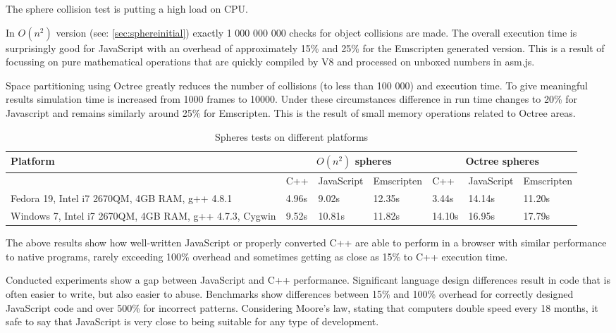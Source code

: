 The sphere collision test is putting a high load on CPU.

In $O(n^2)$ version (see: \ref{sec:sphereinitial}) exactly 1 000 000 000 checks for object collisions are made. The overall execution time is surprisingly good for JavaScript with an overhead of approximately 15\% and 25\% for the Emscripten generated version. This is a result of focussing on pure mathematical operations that are quickly compiled by V8 and processed on unboxed numbers in asm.js.

Space partitioning using Octree greatly reduces the number of collisions (to less than 100 000) and execution time. To give meaningful results simulation time is increased from 1000 frames to 10000. Under these circumstances difference in run time changes to 20\% for Javascript and remains similarly around 25\% for Emscripten. This is the result of small memory operations related to Octree areas.

\begin{table}[h!]
\caption{Spheres tests on different platforms}
\label{table:benchmarks}
\begin{tabular}{|p{4cm}||l|l|l||l|l|l|}
   \hline
   Platform & \multicolumn{3}{c}{$O(n^2)$ spheres} & \multicolumn{3}{c}{Octree spheres}\\ \hline
   & C++ & JavaScript & Emscripten & C++ & JavaScript & Emscripten\\ \hline
   Fedora 19, Intel i7 2670QM, 4GB RAM, g++ 4.8.1 & 4.96s & 9.02s & 12.35s & 
3.44s & 14.14s & 11.20s \\ \hline
   Windows 7, Intel i7 2670QM, 4GB RAM, g++ 4.7.3, Cygwin & 9.52s & 10.81s & 11.82s & 14.10s & 16.95s & 17.79s \\\hline
\end{tabular}
\end{table}

The above results show how well-written JavaScript or properly converted C++ are able to perform in a browser with similar performance to native programs, rarely exceeding 100\% overhead and sometimes getting as close as 15\% to C++ execution time.

Conducted experiments show a gap between JavaScript and C++ performance. Significant language design differences result in code that is often easier to write, but also easier to abuse. Benchmarks show differences between 15\% and 100\% overhead for correctly designed JavaScript code and over 500\% for incorrect patterns. Considering Moore's law, stating that computers double speed every 18 months, it safe to say that JavaScript is very close to being suitable for any type of development.

